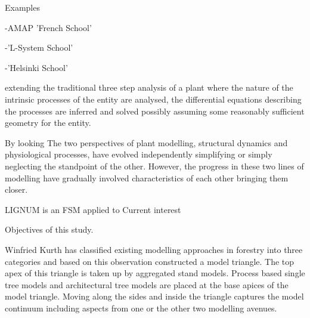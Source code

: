 Examples

-AMAP 'French School'

-'L-System School'

-'Helsinki School'

extending the  traditional three  step analysis of  a plant  where the
nature  of the  intrinsic processes  of the  entity are  analysed, the
differential  equations  describing  the  processes are  inferred  and
solved possibly  assuming some reasonably sufficient  geometry for the
entity.

By  looking  The  two  perspectives  of  plant  modelling,  structural
dynamics  and  physiological  processes,  have  evolved  independently
simplifying  or  simply  neglecting   the  standpoint  of  the  other.
However, the progress  in these two lines of  modelling have gradually
involved characteristics of each other bringing them closer.



LIGNUM is an FSM applied to 
Current interest

Objectives of this study.
 
Winfried  Kurth  has   classified  existing  modelling  approaches  in
forestry  into   three  categories  and  based   on  this  observation
constructed a model triangle.  The  top apex of this triangle is taken
up by aggregated  stand models.  Process based single  tree models and
architectural tree models  are placed at the base  apices of the model
triangle.  Moving along the sides and inside the triangle captures the
model continuum including aspects from  one or the other two modelling
avenues. 

